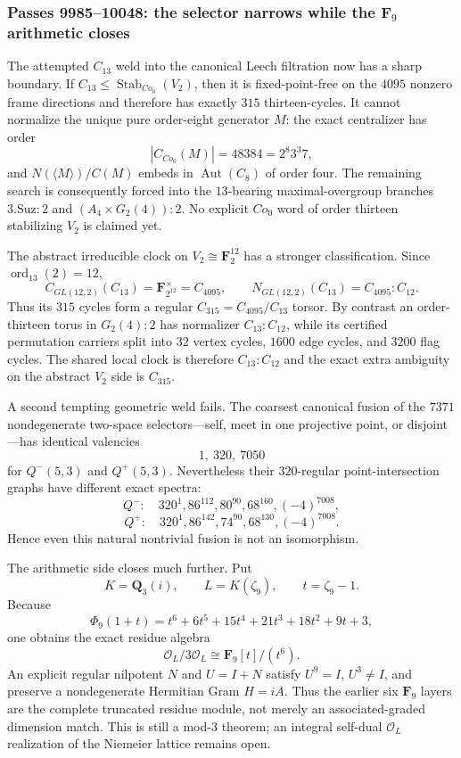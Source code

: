 \subsubsection*{Passes 9985--10048: the selector narrows while the $\mathbf F_9$ arithmetic closes}
The attempted $C_{13}$ weld into the canonical Leech filtration now has a sharp
boundary.  If $C_{13}\leq\operatorname{Stab}_{Co_0}(V_2)$, then it is
fixed-point-free on the $4095$ nonzero frame directions and therefore has
exactly $315$ thirteen-cycles.  It cannot normalize the unique pure order-eight
generator $M$: the exact centralizer has order
\[
 |C_{Co_0}(M)|=48384=2^8 3^3 7,
\]
and $N(\langle M\rangle)/C(M)$ embeds in $\operatorname{Aut}(C_8)$ of order
four.  The remaining search is consequently forced into the $13$-bearing
maximal-overgroup branches $3.\mathrm{Suz}{:}2$ and
$(A_4\times G_2(4)){:}2$.  No explicit $Co_0$ word of order thirteen
stabilizing $V_2$ is claimed yet.

The abstract irreducible clock on $V_2\cong\mathbf F_2^{12}$ has a stronger
classification.  Since $\operatorname{ord}_{13}(2)=12$,
\[
 C_{GL(12,2)}(C_{13})=\mathbf F_{2^{12}}^\times=C_{4095},\qquad
 N_{GL(12,2)}(C_{13})=C_{4095}{:}C_{12}.
\]
Thus its $315$ cycles form a regular $C_{315}=C_{4095}/C_{13}$ torsor.  By
contrast an order-thirteen torus in $G_2(4){:}2$ has normalizer
$C_{13}{:}C_{12}$, while its certified permutation carriers split into $32$
vertex cycles, $1600$ edge cycles, and $3200$ flag cycles.  The shared local
clock is therefore $C_{13}{:}C_{12}$ and the exact extra ambiguity on the
abstract $V_2$ side is $C_{315}$.

A second tempting geometric weld fails.  The coarsest canonical fusion of the
$7371$ nondegenerate two-space selectors---self, meet in one projective point,
or disjoint---has identical valencies
\[
 \boxed{1,\ 320,\ 7050}
\]
for $Q^-(5,3)$ and $Q^+(5,3)$.  Nevertheless their $320$-regular
point-intersection graphs have different exact spectra:
\[
 Q^-:\quad 320^1,86^{112},80^{90},68^{160},(-4)^{7008},
\]
\[
 Q^+:\quad 320^1,86^{142},74^{90},68^{130},(-4)^{7008}.
\]
Hence even this natural nontrivial fusion is not an isomorphism.

The arithmetic side closes much further.  Put
\[
 K=\mathbf Q_3(i),\qquad L=K(\zeta_9),\qquad t=\zeta_9-1.
\]
Because
\[
 \Phi_9(1+t)=t^6+6t^5+15t^4+21t^3+18t^2+9t+3,
\]
one obtains the exact residue algebra
\[
 \boxed{\mathcal O_L/3\mathcal O_L\cong\mathbf F_9[t]/(t^6)}.
\]
An explicit regular nilpotent $N$ and $U=I+N$ satisfy $U^9=I$, $U^3\neq I$,
and preserve a nondegenerate Hermitian Gram $H=iA$.  Thus the earlier six
$\mathbf F_9$ layers are the complete truncated residue module, not merely an
associated-graded dimension match.  This is still a mod-$3$ theorem; an
integral self-dual $\mathcal O_L$ realization of the Niemeier lattice remains
open.

